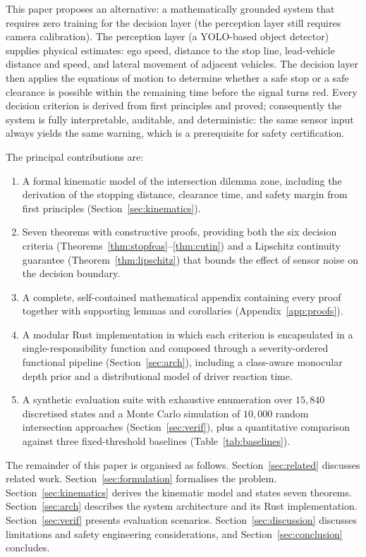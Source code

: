 \documentclass[conference, a4paper]{IEEEtran}
\theoremstyle{plain}
\begin{document}
This paper proposes an alternative: a mathematically grounded system that
requires zero training for the decision layer (the perception layer still
requires camera calibration). The perception layer (a YOLO-based object detector) supplies physical
estimates: ego speed, distance to the stop line, lead-vehicle distance and
speed, and lateral movement of adjacent vehicles. The decision layer then
applies the equations of motion to determine whether a safe stop or a safe
clearance is possible within the remaining time before the signal turns red.
Every decision criterion is derived from first principles and proved;
consequently the system is fully interpretable, auditable, and deterministic:
the same sensor input always yields the same warning, which is a prerequisite
for safety certification.

The principal contributions are:
\begin{enumerate}
\item A formal kinematic model of the intersection dilemma zone, including
      the derivation of the stopping distance, clearance time, and safety
      margin from first principles (Section~\ref{sec:kinematics}).
\item Seven theorems with constructive proofs, providing both the six
      decision criteria (Theorems~\ref{thm:stopfeas}--\ref{thm:cutin}) and a
      Lipschitz continuity guarantee (Theorem~\ref{thm:lipschitz}) that
      bounds the effect of sensor noise on the decision boundary.
\item A complete, self-contained mathematical appendix containing every proof
      together with supporting lemmas and corollaries
      (Appendix~\ref{app:proofs}).
\item A modular Rust implementation in which each criterion is encapsulated
      in a single-responsibility function and composed through a
      severity-ordered functional pipeline (Section~\ref{sec:arch}),
      including a class-aware monocular depth prior and a distributional
      model of driver reaction time.
\item A synthetic evaluation suite with exhaustive enumeration over
      $15{,}840$ discretised states and a Monte Carlo simulation of $10{,}000$ random
      intersection approaches (Section~\ref{sec:verif}), plus a quantitative
      comparison against three fixed-threshold baselines
      (Table~\ref{tab:baselines}).
\end{enumerate}

The remainder of this paper is organised as follows.
Section~\ref{sec:related} discusses related work.
Section~\ref{sec:formulation} formalises the problem.
Section~\ref{sec:kinematics} derives the kinematic model and states seven
theorems.
Section~\ref{sec:arch} describes the system architecture and its Rust
implementation.
Section~\ref{sec:verif} presents evaluation scenarios.
Section~\ref{sec:discussion} discusses limitations and safety engineering
considerations, and Section~\ref{sec:conclusion} concludes.
\end{document}
